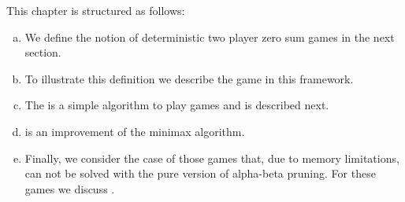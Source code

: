 This chapter is structured as follows:
\begin{enumerate}[(a)]
\item We define the notion of deterministic two player zero sum games in the next section.
\item To illustrate this definition we describe the game  in this framework.
\item The  is a simple algorithm to play games and is described next.
\item {} is an improvement of the minimax algorithm.
\item Finally, we consider the case of those games that, due to memory limitations, can not be solved
      with the pure version of alpha-beta pruning.  For these games we discuss . 
\end{enumerate}

